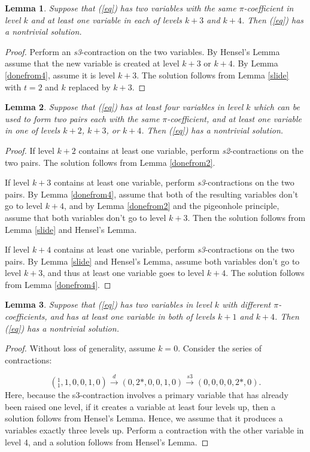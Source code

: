 \documentclass[draft]{publmathdeb}
\newtheorem{lemma}{Lemma}
\begin{document}
\begin{lemma} \label{doneafters3}
Suppose that (\ref{eq}) has two variables with the same $\pi$-coefficient in level $k$ and at least one variable in each of levels $k+3$ and $k+4$.  Then (\ref{eq}) has a nontrivial solution.
\end{lemma}
\begin{proof}
Perform an \textit{s3}-contraction on the two variables.
By Hensel's Lemma assume that the new variable is created at level $k+3$ or $k+4$.
By Lemma \ref{donefrom4}, assume it is level $k+3$.
The solution follows from Lemma \ref{slide} with $t=2$ and $k$ replaced by $k+3$.
\end{proof}

\begin{lemma} \label{empty234}
Suppose that (\ref{eq}) has at least four variables in level $k$ which can be used to form two pairs each with the same $\pi$-coefficient, and at least one variable in one of levels $k+2$, $k+3$, or $k+4$.  Then (\ref{eq}) has a nontrivial solution.
\end{lemma}
\begin{proof}
If level $k+2$ contains at least one variable, perform \textit{s2}-contractions on the two pairs.  The solution follows from Lemma \ref{donefrom2}.

If level $k+3$ contains at least one variable, perform \textit{s3}-contractions on the two pairs.  By Lemma \ref{donefrom4}, assume that both of the resulting variables don't go to level $k+4$, and by Lemma \ref{donefrom2} and the pigeonhole principle, assume that both variables don't go to level $k+3$.  Then the solution follows from Lemma \ref{slide} and Hensel's Lemma.

If level $k+4$ contains at least one variable, perform \textit{s3}-contractions on the two pairs.  By Lemma \ref{slide} and Hensel's Lemma, assume both variables don't go to level $k+3$, and thus at least one variable goes to level $k+4$.  The solution follows from Lemma \ref{donefrom4}.
\end{proof}

\begin{lemma} \label{oneofempty14}
Suppose that (\ref{eq}) has two variables in level $k$ with different $\pi$-coefficients, and has at least one variable in both of levels $k+1$ and $k+4$.  Then (\ref{eq}) has a nontrivial solution.
\end{lemma}
\begin{proof}
Without loss of generality, assume $k=0$.  Consider the series of contractions:

$$({}^{1}_{1},1,0,0,1,0) \xrightarrow{d}
(0,2*,0,0,1,0) \xrightarrow{s3}
(0,0,0,0,2*,0).$$
Here, because the s3-contraction involves a primary variable that has already been raised one level, if it creates a variable at least four levels up, then a solution follows from Hensel's Lemma.  Hence, we assume that it produces a variables exactly three levels up.  Perform a contraction with the other variable in level 4, and a solution follows from Hensel's Lemma.
\end{proof}
\end{document}
